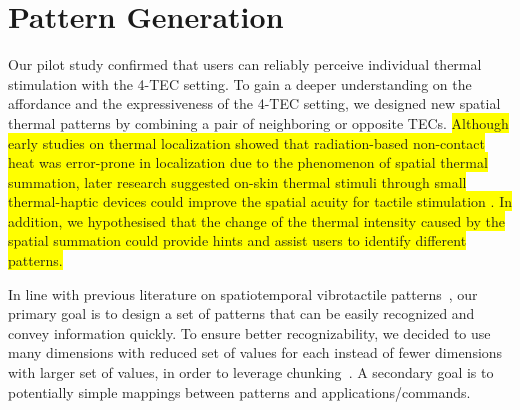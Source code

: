 \documentclass[preprint,12pt]{elsarticle}
\begin{document}

\section{Pattern Generation}
Our pilot study confirmed that users can reliably perceive individual thermal stimulation with the 4-TEC setting. To gain a deeper understanding on the affordance and the expressiveness of the 4-TEC setting, we designed new spatial thermal patterns by combining a pair of neighboring or opposite TECs. \colorbox{yellow}{Although early studies \cite{26,27,31} on thermal localization showed that radiation-based non-contact heat was error-prone in localization due to the phenomenon of spatial thermal summation, later research suggested on-skin thermal stimuli through small thermal-haptic devices could improve the spatial acuity for tactile stimulation \cite{28}. In addition, we hypothesised that the change of the thermal intensity caused by the spatial summation could provide hints and assist users to identify different patterns.}

In line with previous literature on spatiotemporal vibrotactile patterns~\cite{Alvina2015,Semfeel}, our primary goal is to design a set of patterns that can be easily recognized and convey information quickly. To ensure better recognizability, we decided to use many dimensions with reduced set of values for each instead of fewer dimensions with larger set of values, in order to leverage chunking~\cite{Miller1956}.
A secondary goal is to potentially simple mappings between patterns and applications/commands.
\end{document}
